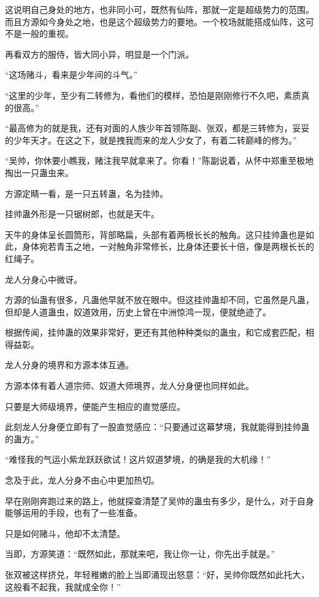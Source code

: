 \begin{this_body}
这说明自己身处的地方，也非同小可，既然有仙阵，那就一定是超级势力的范围。而且方源如今身处之地，也是这个超级势力的要地。一个校场就能搭成仙阵，这可不是一般的重视。

再看双方的服侍，皆大同小异，明显是一个门派。

“这场赌斗，看来是少年间的斗气。”

“这里的少年，至少有二转修为，看他们的模样，恐怕是刚刚修行不久吧，素质真的很高。”

“最高修为的就是我，还有对面的人族少年首领陈副、张双，都是三转修为，妥妥的少年天才。在这之下，就是拽我而来的龙人少女了，有着二转巅峰的修为。”

“吴帅，你休要小瞧我，赌注我早就拿来了。你看！”陈副说着，从怀中郑重至极地掏出一只蛊虫来。

方源定睛一看，是一只五转蛊，名为挂帅。

挂帅蛊外形是一只锯树郎，也就是天牛。

天牛的身体呈长圆筒形，背部略扁，头部有着两根长长的触角。这只挂帅蛊也是如此，身体宛若青玉之地，一对触角非常修长，比身体还要长十倍，像是两根长长的红绳子。

龙人分身心中微讶。

方源的仙蛊有很多，凡蛊他早就不放在眼中。但这挂帅蛊却不同，它虽然是凡蛊，但却是人道蛊虫，奴道效用，历史上曾在中洲惊鸿一现，便就绝迹了。

根据传闻，挂帅蛊的效果非常好，更还有其他种种类似的蛊虫，和它成套匹配，相得益彰。

龙人分身的境界和方源本体互通。

方源本体有着人道宗师、奴道大师境界，龙人分身便也同样如此。

只要是大师级境界，便能产生相应的直觉感应。

此刻龙人分身便立即有了一股直觉感应：“只要通过这幕梦境，我就能得到挂帅蛊的蛊方。”

“难怪我的气运小紫龙跃跃欲试！这片奴道梦境，的确是我的大机缘！”

念及于此，龙人分身不由心中更加热切。

早在刚刚奔跑过来的路上，他就探查清楚了吴帅的蛊虫有多少，是什么，对于自身能够运用的手段，也有了一些准备。

只是如何赌斗，他却不太清楚。

当即，方源笑道：“既然如此，那就来吧，我让你一让，你先出手就是。”

张双被这样挤兑，年轻稚嫩的脸上当即涌现出怒意：“好，吴帅你既然如此托大，这般看不起我，我就成全你！”


\end{this_body}
